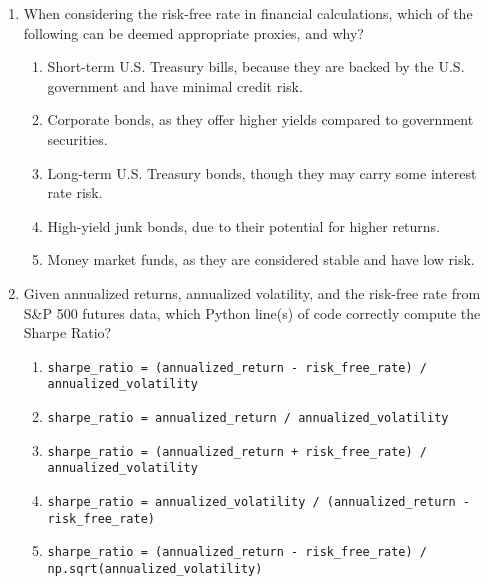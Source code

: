 \documentclass{article}
\begin{document}
\begin{enumerate}
    \item When considering the risk-free rate in financial calculations, which of the following can be deemed appropriate proxies, and why?
    \begin{enumerate}
        \item Short-term U.S. Treasury bills, because they are backed by the U.S. government and have minimal credit risk.
        \item Corporate bonds, as they offer higher yields compared to government securities.
        \item Long-term U.S. Treasury bonds, though they may carry some interest rate risk.
        \item High-yield junk bonds, due to their potential for higher returns.
        \item Money market funds, as they are considered stable and have low risk.
    \end{enumerate}

    \item Given annualized returns, annualized volatility, and the risk-free rate from S\&P 500 futures data, which Python line(s) of code correctly compute the Sharpe Ratio?
    \begin{enumerate}
        \item \texttt{sharpe\_ratio = (annualized\_return - risk\_free\_rate) / annualized\_volatility}
        \item \texttt{sharpe\_ratio = annualized\_return / annualized\_volatility}
        \item \texttt{sharpe\_ratio = (annualized\_return + risk\_free\_rate) / annualized\_volatility}
        \item \texttt{sharpe\_ratio = annualized\_volatility / (annualized\_return - risk\_free\_rate)}
        \item \texttt{sharpe\_ratio = (annualized\_return - risk\_free\_rate) / np.sqrt(annualized\_volatility)}
    \end{enumerate}


\end{enumerate}
\end{document}
